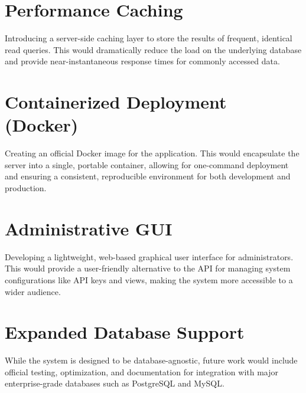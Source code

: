\documentclass[12pt, a4paper]{report}
\begin{document}
\section{Performance Caching}
Introducing a server-side caching layer to store the results of frequent, identical read queries. This would dramatically reduce the load on the underlying database and provide near-instantaneous response times for commonly accessed data.

\section{Containerized Deployment (Docker)}
Creating an official Docker image for the application. This would encapsulate the server into a single, portable container, allowing for one-command deployment and ensuring a consistent, reproducible environment for both development and production.

\section{Administrative GUI}
Developing a lightweight, web-based graphical user interface for administrators. This would provide a user-friendly alternative to the API for managing system configurations like API keys and views, making the system more accessible to a wider audience.

\section{Expanded Database Support}
While the system is designed to be database-agnostic, future work would include official testing, optimization, and documentation for integration with major enterprise-grade databases such as PostgreSQL and MySQL.
\end{document}
